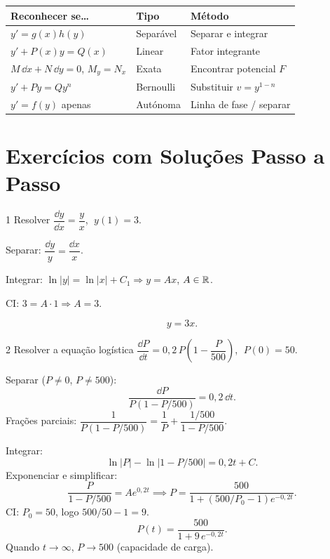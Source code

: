 \begin{center}
\renewcommand{\arraystretch}{1.4}
\begin{tabular}{p{4.0cm} p{4.0cm} p{5.0cm}}
  \toprule
  \textbf{Reconhecer se\ldots} & \textbf{Tipo} & \textbf{Método} \\
  \midrule
  $y'= g(x)h(y)$                      & Separável  & Separar e integrar \\
  $y' + P(x)y = Q(x)$                 & Linear     & Fator integrante \\
  $M\,\dd x + N\,\dd y=0$, $M_y=N_x$ & Exata      & Encontrar potencial $F$ \\
  $y' + Py = Qy^n$                    & Bernoulli  & Substituir $v=y^{1-n}$ \\
  $y'=f(y)$ apenas                     & Autónoma   & Linha de fase / separar \\
  \bottomrule
\end{tabular}
\end{center}

\section{Exercícios com Soluções Passo a Passo}
\label{sec:exercises5}

\begin{exercisebox}{1}
  Resolver $\dfrac{\dd y}{\dd x} = \dfrac{y}{x}$, $\;y(1)=3$.
\end{exercisebox}

\begin{solbox}
  Separar: $\dfrac{\dd y}{y} = \dfrac{\dd x}{x}$.

  Integrar: $\ln|y| = \ln|x| + C_1 \Rightarrow y = Ax$, $A\in\mathbb{R}$.

  CI: $3 = A\cdot 1 \Rightarrow A=3$.

  \[
    \boxed{y = 3x.}
  \]
\end{solbox}

\begin{exercisebox}{2}
  Resolver a equação logística
  $\dfrac{\dd P}{\dd t} = 0{,}2\,P\!\left(1 - \dfrac{P}{500}\right)$, $\;P(0) = 50$.
\end{exercisebox}

\begin{solbox}
  Separar ($P\neq 0$, $P\neq 500$):
  \[
    \frac{\dd P}{P(1-P/500)} = 0{,}2\,\dd t.
  \]
  Frações parciais: $\dfrac{1}{P(1-P/500)} = \dfrac{1}{P} + \dfrac{1/500}{1-P/500}$.

  Integrar:
  \[
    \ln|P| - \ln|1-P/500| = 0{,}2t + C.
  \]
  Exponenciar e simplificar:
  \[
    \frac{P}{1-P/500} = Ae^{0{,}2t}
    \implies P = \frac{500}{1+(500/P_0-1)e^{-0{,}2t}}.
  \]
  CI: $P_0=50$, logo $500/50 - 1 = 9$.
  \[
    \boxed{P(t) = \frac{500}{1+9\,e^{-0{,}2t}}.}
  \]
  Quando $t\to\infty$, $P\to 500$ (capacidade de carga).
\end{solbox}

